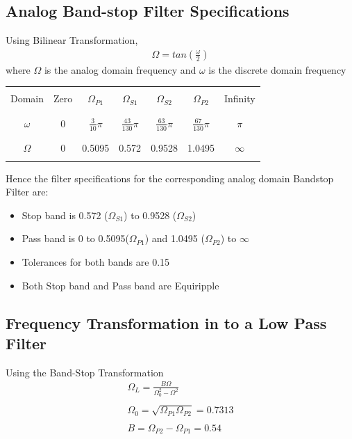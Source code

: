 \documentclass[12pt]{article}
\begin{document}
\color{cyan}
\subsection{Analog Band-stop Filter Specifications}
\color{black}
Using Bilinear Transformation,
\begin{gather*}
	\Omega = tan\left(\frac{\omega}{2}\right)
\end{gather*}
where $\Omega$ is the analog domain frequency and $\omega$ is the discrete domain frequency\\

\begin{center}
	\begin{tabular}{ |c|c|c|c|c|c|c| }
		\hline
		&&&&&&\\
		Domain & Zero & $\Omega_{P1}$ & $\Omega_{S1}$ &$\Omega_{S2}$& $\Omega_{P2}$& Infinity\\
		&&&&&&\\
		\hline
		&&&&&&\\
		$\omega$ & 0 & $\frac{3}{10}\pi$ & $\frac{43}{130}\pi$& $\frac{63}{130}\pi$& $\frac{67}{130}\pi$& $\pi$\\
		&&&&&&\\
		\hline
		&&&&&&\\
		$\Omega$ & 0 & 0.5095 & 0.572 & 0.9528 & 1.0495 & $\infty$\\
		&&&&&&\\
		\hline
	\end{tabular}
\end{center}

\noindent Hence the filter specifications for the corresponding analog domain Bandstop Filter are:
\begin{itemize}
	\item Stop band is 0.572 ($\Omega_{S1}$)  to 0.9528 ($\Omega_{S2}$) 
	\item Pass band is 0 to 0.5095($\Omega_{P1}$) and 1.0495 ($\Omega_{P2}$) to $\infty$
	\item Tolerances for both bands are 0.15
	\item Both Stop band and Pass band are Equiripple
\end{itemize}

\color{cyan}
\subsection{Frequency Transformation in to a Low Pass Filter}
\color{black}
Using the Band-Stop Transformation
\begin{gather*}
	\Omega_L = \frac{B\Omega}{\Omega_0^2 - \Omega^2}\\\\
	\Omega_0 = \sqrt{\Omega_{P1} \Omega_{P2}} = 0.7313\\\\
	B = \Omega_{P2} - \Omega_{P1} = 0.54
\end{gather*}
\end{document}
